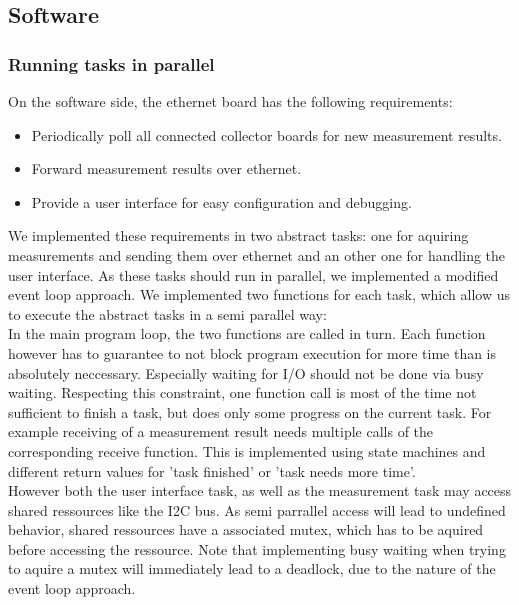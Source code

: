 \documentclass[a4paper]{scrreprt}
\begin{document}
\subsection{Software}
\subsubsection{Running tasks in parallel}
On the software side, the ethernet board has the following requirements:
\begin{itemize}
  \item Periodically poll all connected collector boards for new measurement results.
  \item Forward measurement results over ethernet.
  \item Provide a user interface for easy configuration and debugging.
\end{itemize}
We implemented these requirements in two abstract tasks: one for aquiring measurements and sending them
over ethernet and an other one for handling the user interface.
As these tasks should run in parallel, we implemented a modified event loop approach. We
implemented two functions for each task, which allow us to execute the abstract tasks
in a semi parallel way:\\
In the main program loop, the two functions are called in turn. Each function however has to guarantee to
not block program execution for more time than is absolutely neccessary. Especially waiting for I/O
should not be done via busy waiting. Respecting this constraint, one function
call is most of the time not sufficient to finish a task, but does only some progress on the
current task. For example receiving of a measurement result needs multiple calls
of the corresponding receive function. This is implemented using state machines and different
return values for 'task finished' or 'task needs more time'.\\
However both the user interface task, as well as the measurement task may access shared ressources
like the I2C bus. As semi parrallel access will lead to undefined behavior, shared ressources
have a associated mutex, which has to be aquired before accessing the ressource. Note that implementing
busy waiting when trying to aquire a mutex will immediately lead to a deadlock, due to the nature
of the event loop approach.
\end{document}
